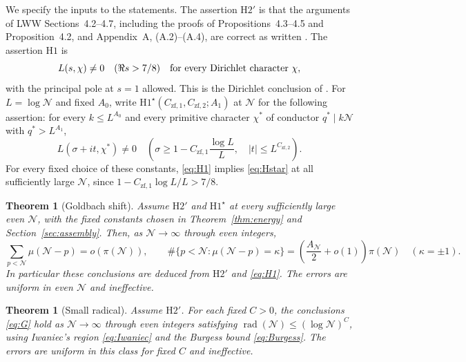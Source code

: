 \documentclass[11pt]{article}
\newtheorem{theoremG}{Theorem}
\newtheorem{theoremS}{Theorem}
\theoremstyle{definition}
\DeclareMathOperator{\rad}{rad}
\newcommand{\GN}{\mathcal N}
\newcommand{\LWW}[1]{\cite[#1]{LWW}}
\theoremstyle{remark}
\numberwithin{equation}{section}
\begin{document}
We specify the inputs to the statements. The assertion $\mathrm H2'$ is
that the arguments of LWW Sections~4.2--4.7, including the proofs of
Propositions~4.3--4.5 and Proposition~4.2, and Appendix~A,
(A.2)--(A.4), are correct as written
\LWW{pp.~17--39, 48--50}. The assertion $\mathrm H1$ is
\begin{equation}\label{eq:H1}
 L(s,\chi)\ne0\quad(\Re s>7/8)
 \quad\hbox{for every Dirichlet character $\chi$},
\end{equation}
with the principal pole at $s=1$ allowed. This is the Dirichlet
conclusion of \cite[Section~1, Theorem~1.1, p.~4]{OpenAIQ78}.
For $L=\log\GN$ and fixed $A_0$, write
$\mathrm H1^\star(C_{\mathrm{zf},1},C_{\mathrm{zf},2};A_1)$ at $\GN$
for the following assertion: for every $k\le L^{A_0}$ and every primitive
character $\chi^*$ of conductor $q^*\mid k\GN$ with $q^*>L^{A_1}$,
\begin{equation}\label{eq:Hstar}
 L(\sigma+it,\chi^*)\ne0\quad\left(
 \sigma\ge1-C_{\mathrm{zf},1}\frac{\log L}{L},\quad
 |t|\le L^{C_{\mathrm{zf},2}}\right).
\end{equation}
For every fixed choice of these constants, \eqref{eq:H1} implies
\eqref{eq:Hstar} at all sufficiently large $\GN$, since
$1-C_{\mathrm{zf},1}\log L/L>7/8$.

\begin{theoremG}[Goldbach shift]\label{thm:G}
Assume $\mathrm H2'$ and $\mathrm H1^\star$ at every sufficiently large
even $\GN$, with the fixed constants chosen in
Theorem~\ref{thm:energy} and Section~\ref{sec:assembly}.
Then, as $\GN\to\infty$ through even integers,
\begin{equation}\label{eq:G}
 \sum_{p<\GN}\mu(\GN-p)=o(\pi(\GN)),\qquad
 \#\{p<\GN:\mu(\GN-p)=\kappa\}
 =\left(\frac{A_{\GN}}2+o(1)\right)\pi(\GN)
 \quad(\kappa=\pm1).
\end{equation}
In particular these conclusions are deduced from $\mathrm H2'$ and
\eqref{eq:H1}. The errors are uniform in even $\GN$ and ineffective.
\end{theoremG}

\begin{theoremS}[Small radical]\label{thm:S}
Assume $\mathrm H2'$. For each fixed $C>0$, the conclusions
\eqref{eq:G} hold as $\GN\to\infty$ through even integers satisfying
$\rad(\GN)\le(\log\GN)^C$, using Iwaniec's region
\eqref{eq:Iwaniec} and the Burgess bound \eqref{eq:Burgess}.
The errors are uniform in this class for fixed $C$ and ineffective.
\end{theoremS}
\end{document}
